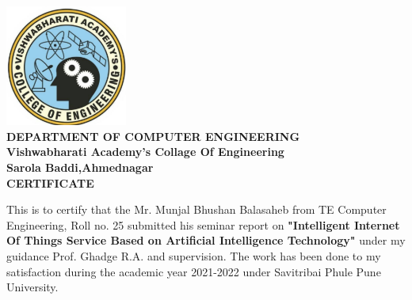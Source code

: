 \documentclass[12pt]{report}
\begin{document}
\begin{center}
 

\includegraphics[width=4cm, height=4cm]{collagelogo.png} \\
\vspace{0.5in}
\fontsize{14pt}{16pt}\selectfont \textbf{DEPARTMENT OF COMPUTER ENGINEERING}\\
\fontsize{12pt}{14pt}\selectfont \textbf{Vishwabharati Academy's Collage Of Engineering \\
Sarola Baddi,Ahmednagar}\\[0.7in]
\fontsize{18pt}{18pt}\selectfont \textbf {CERTIFICATE }\\[0.5in]
\fontsize{12pt}{14pt}\selectfont   
\begin{flushleft}
This is to certify that the Mr. Munjal Bhushan Balasaheb from TE Computer Engineering, Roll no. 25  submitted his seminar report on \textbf{"Intelligent Internet Of Things Service Based on
Artificial Intelligence Technology"} under my guidance  Prof. Ghadge R.A. and supervision. The work has been done to my satisfaction during the academic year 2021-2022 under Savitribai Phule Pune University. 
\end{flushleft}
\vspace{1.5in}
\begin{flushleft}


\end{flushleft}
\end{center}
\end{document}
